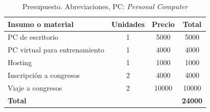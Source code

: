 \documentclass[a4paper]{article}
\begin{document}
\begin{table}[H]
	\centering
	\setlength{\tabcolsep}{0.5em} %
	{\renewcommand{\arraystretch}{1.2}%
		\caption{Presupuesto. Abreviaciones, PC: \textit{Personal Computer}}
		\label{tab:presupuesto}
	\begin{tabular}{|p{5cm}|c|c|c|} \hline
		\textbf{Insumo o material}    & \textbf{Unidades} & \textbf{Precio} & \textbf{Total} \\ \hline
		PC de escritorio              & 1                 & 5000            & 5000           \\
		PC virtual para entrenamiento & 1                 & 4000            & 4000           \\
		Hosting                       & 1                 & 1000            & 1000           \\
		Inscripción a congresos       & 2                 & 4000            & 4000           \\
		Viaje a congresos             & 2                 & 10000           & 10000          \\ \hline
		\textbf{Total}                         &                   &                 & \textbf{24000}         \\ \hline
	\end{tabular}
}
\end{table}

\clearpage
	
	
	
	
\end{document}
